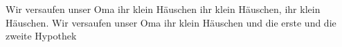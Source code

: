 \begin{verse*}
Wir versaufen unser Oma ihr klein Häuschen
ihr klein Häuschen, ihr klein Häuschen.
Wir versaufen unser Oma ihr klein Häuschen
und die erste und die zweite Hypothek
\end{verse*}
